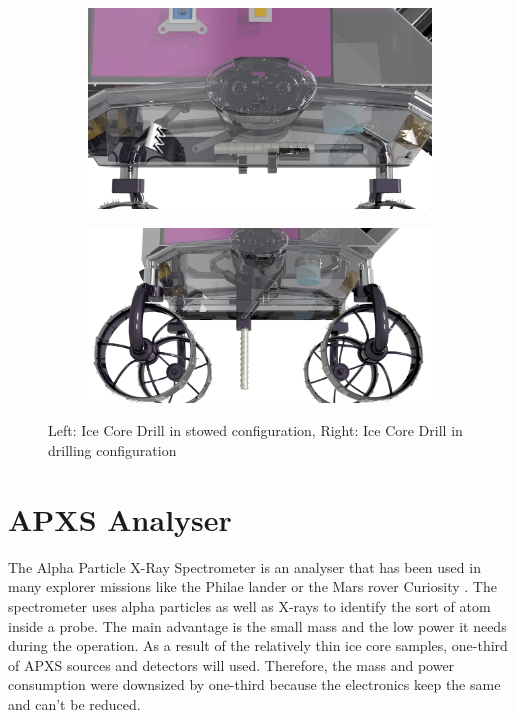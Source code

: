 \begin{figure}[htb]
     \centering
     \begin{subfigure}[b]{0.45\textwidth}
         \centering
         \includegraphics[width=\textwidth]{Media/DrillingBay3}
         \label{fig:stowedDrill}
     \end{subfigure}
     \hfill
     \begin{subfigure}[b]{0.45\textwidth}
         \centering
         \includegraphics[width=\textwidth]{Media/DrillingBay_unfolded2}
         \label{fig:drillconfig}
     \end{subfigure}
     \hfill
     \caption{Left: Ice Core Drill in stowed configuration, Right: Ice Core Drill in drilling configuration}
     \label{fig:DrillBay}
\end{figure}

\section{APXS Analyser}
The Alpha Particle X-Ray Spectrometer is an analyser that has been used in many explorer missions like the Philae lander or the Mars rover Curiosity \cite{ref_pay_1, ref_pay_2}.
The spectrometer uses alpha particles as well as X-rays to identify the sort of atom inside a probe.
The main advantage is the small mass and the  low power it needs during the operation.
As a result of the relatively thin ice core samples, one-third of APXS sources and detectors will used.
Therefore, the mass and power consumption were downsized by one-third because the electronics keep the same and can't be reduced.


